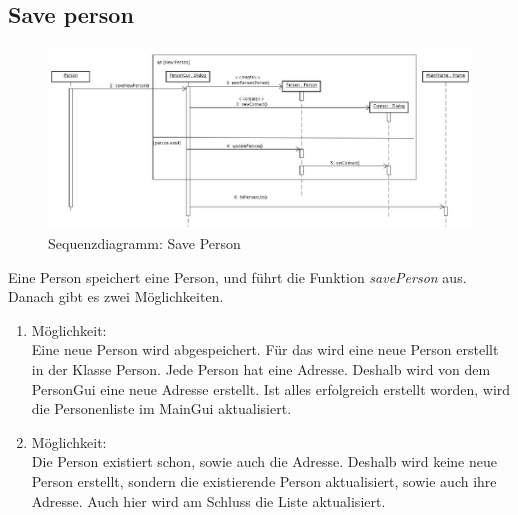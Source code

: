 \subsection{Save person}
\begin{figure}[ht]
\begin{center}
\includegraphics[width=15cm]{images/savePerson.png}
\caption{Sequenzdiagramm: Save Person}
\end{center}
\end{figure}
%
Eine Person speichert eine Person, und führt die Funktion \textit{savePerson} aus. Danach gibt
es zwei Möglichkeiten.
%
\begin{enumerate}
\item Möglichkeit:\\
Eine neue Person wird abgespeichert. Für das wird eine neue Person erstellt in der Klasse
Person. Jede Person hat eine Adresse. Deshalb wird von dem PersonGui eine neue
Adresse erstellt. Ist alles erfolgreich erstellt worden, wird die Personenliste im MainGui
aktualisiert.
%
\item Möglichkeit:\\
Die Person existiert schon, sowie auch die Adresse. Deshalb wird keine neue Person
erstellt, sondern die existierende Person aktualisiert, sowie auch ihre Adresse. Auch hier
wird am Schluss die Liste aktualisiert.
\end{enumerate}
%
\clearpage
%
